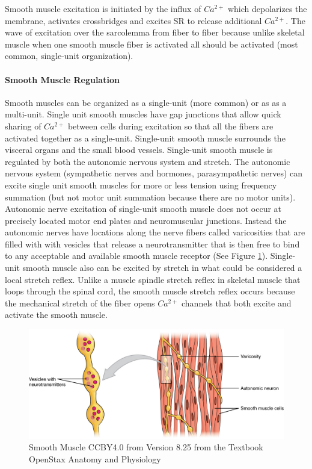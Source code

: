 Smooth muscle excitation is initiated by the influx of $Ca^{2+}$ which depolarizes the membrane, activates crossbridges and excites SR to release additional $Ca^{2+}$. The wave of excitation over the sarcolemma from fiber to fiber because unlike skeletal muscle when one smooth muscle fiber is activated all should be activated (most common, single-unit organization).

\paragraph{Smooth Muscle Regulation}

Smooth muscles can be organized as a single-unit (more common) or as as a multi-unit.
Single unit smooth muscles have gap junctions that allow quick sharing of $Ca^{2+}$ between cells during excitation so that all the fibers are activated together as a single-unit. Single-unit smooth muscle surrounds the visceral organs and the small blood vessels. Single-unit smooth muscle is regulated by both the autonomic nervous system and stretch. The autonomic nervous system (sympathetic nerves and hormones, parasympathetic nerves) can excite single unit smooth muscles for more or less tension using frequency summation (but not motor unit summation because there are no motor units). Autonomic nerve excitation of single-unit smooth muscle does not occur at precisely located motor end plates and neuromuscular junctions. Instead the autonomic nerves have locations along the nerve fibers called varicosities that are filled with with vesicles that release a neurotransmitter that is then free to bind to any acceptable and available smooth muscle receptor (See Figure \ref{fig:Smooth_Muscle}). Single-unit smooth muscle also can be excited by stretch in what could be considered a local stretch reflex. Unlike a muscle spindle stretch reflex in skeletal muscle that loops through the spinal cord, the smooth muscle stretch reflex occurs because the mechanical stretch of the fiber opens $Ca^{2+}$ channels that both excite and activate the smooth muscle.

\begin{figure}[!h]
    \centering
    \includegraphics[width=1\linewidth]{./figure/Smooth_Muscle.jpg}
    \caption{Smooth Muscle \footnotesize{CCBY4.0 from Version 8.25 from the Textbook OpenStax Anatomy and Physiology}}
    \label{fig:Smooth_Muscle}
\end{figure}

